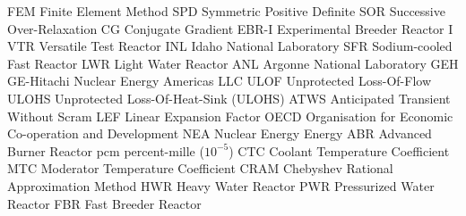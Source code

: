\makeglossaries

   {FEM}   {Finite Element Method}
   {SPD}   {Symmetric Positive Definite}
   {SOR}   {Successive Over-Relaxation}
    {CG}    {Conjugate Gradient}
 {EBR-I} {Experimental Breeder Reactor I}
   {VTR}   {Versatile Test Reactor}
   {INL}   {Idaho National Laboratory}
   {SFR}   {Sodium-cooled Fast Reactor}
   {LWR}   {Light Water Reactor}
   {ANL}   {Argonne National Laboratory}
   {GEH}   {GE-Hitachi Nuclear Energy Americas LLC}
  {ULOF}  {Unprotected Loss-Of-Flow}
 {ULOHS} {Unprotected Loss-Of-Heat-Sink (ULOHS)}
  {ATWS}  {Anticipated Transient Without Scram}
   {LEF}   {Linear Expansion Factor}
  {OECD}  {Organisation for Economic Co-operation and Development}
   {NEA}   {Nuclear Energy Energy}
   {ABR}   {Advanced Burner Reactor}
   {pcm}   {percent-mille ($10^{-5}$)}
   {CTC}   {Coolant Temperature Coefficient}
   {MTC}   {Moderator Temperature Coefficient}
  {CRAM}  {Chebyshev Rational Approximation Method}
   {HWR}   {Heavy Water Reactor}
   {PWR}   {Pressurized Water Reactor}
   {FBR}   {Fast Breeder Reactor}

